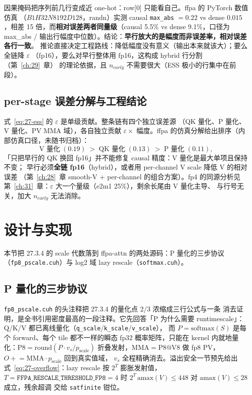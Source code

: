 因果掩码把序列前几行变成近 one-hot：row[0] 只能看自己。ffpa 的 PyTorch 数值仿真
（$B1H32N8192D128$，randn）实测 causal \texttt{max\_abs} $= 0.22$ vs dense
$0.015$，相差 15 倍，而\textbf{相对误差两者同量级}（causal 5.5\% vs dense
9.1\%，口径为 max\_abs / 输出行幅度中位数）。结论：\textbf{早行放大的是幅度而非误差率，相对误差各行一致}。
推论直接决定工程路线：降低幅度没有意义（输出本来就该大）；要么全链降 $\varepsilon$
（fp16），要么对早行整体用 fp16，这构成 hybrid 行分割（第~\ref{ch:29}~章）
的理论依据，且 $n_{early}$ 不需要很大（ESS 极小的行集中在前段）。

\subsection{per-stage 误差分解与工程结论}

式~\ref{eq:27-ess} 的 $\varepsilon$ 是单级贡献。整条链有四个独立误差源
（QK 量化、P 量化、V 量化、PV MMA 域），各自独立贡献
$\varepsilon \times$ 幅度。ffpa 的仿真分解给出排序（内部仿真口径，未随书归档）：
\begin{equation}
  \text{V 量化}\;(0.19) \;>\; \text{QK 量化}\;(0.13) \;>\; \text{P 量化}\;(0.11),
\end{equation}
「只把早行的 QK 换回 fp16」并不能修复 causal 精度：V 量化是最大单项且保持不变；
早行必须\textbf{全链 fp16}（hybrid），或者用 per-channel V scale 降低 V 的相对误差
（第~\ref{ch:28}~章 smooth-V + per-channel 的组合方案）。fp4 的同源分析见
第~\ref{ch:31}~章：$\varepsilon$ 大一个量级（e2m1 25\%），剩余长尾由 V 量化主导、
与行号无关，加大 $n_{early}$ 无法消除。

\section{设计与实现}

本节把 27.3.4 的 scale 代数落到 ffpa-attn 的两处源码：P 量化的三步协议
（\texttt{fp8\_pscale.cuh}）与 log2 域 lazy rescale（\texttt{softmax.cuh}）。

\subsection{P 量化的三步协议}

\texttt{fp8\_pscale.cuh} 的头注释把 27.3.4 的量化点 2/3 浓缩成三行公式与一条
消去证明，是全书引用密度最高的一段注释。它先回答「P 为什么需要 runtimescale」：Q/K/V 都已离线量化（\texttt{q\_scale}/\texttt{k\_scale}/\texttt{v\_scale}），
而 $P = \mathrm{softmax}(S)$ 是每个 forward、每个 tile 都不一样的瞬态 fp32
概率矩阵，只能在 kernel 内就地量化：$\mathrm{P8} = \mathrm{round}(P \cdot
v_s / p_{\mathrm{scale}})$ 折叠发射，$\mathrm{MMA} = \mathrm{P8} @ \mathrm{V8}$
做 fp8 PV，$O \mathrel{+}= \mathrm{MMA} \cdot p_{\mathrm{scale}}$ 回到真实值域，
$v_s$ 全程精确消去。溢出安全一节预先给出式~\ref{eq:27-overflow}：lazy rescale 按
$2^{T}$ 膨胀发射值，$T = \texttt{FFPA\_RESCALE\_THRESHOLD\_FP8} = 4$ 时
$2^{T}\,\mathrm{amax}(V) \le 448$ 对 $\mathrm{amax}(V) \le 28$ 成立，残余超调
交给 \texttt{satfinite} 钳位。


